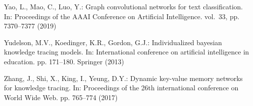 \documentclass[runningheads]{llncs}
\begin{document}
\begin{thebibliography}{10}
	Yao, L., Mao, C., Luo, Y.: Graph convolutional networks for text
	classification. In: Proceedings of the AAAI Conference on Artificial
	Intelligence. vol.~33, pp. 7370--7377 (2019)
	
	Yudelson, M.V., Koedinger, K.R., Gordon, G.J.: Individualized bayesian
	knowledge tracing models. In: International conference on artificial
	intelligence in education. pp. 171--180. Springer (2013)
	
	Zhang, J., Shi, X., King, I., Yeung, D.Y.: Dynamic key-value memory networks
	for knowledge tracing. In: Proceedings of the 26th international conference
	on World Wide Web. pp. 765--774 (2017)
	\end{thebibliography}
\end{document}
